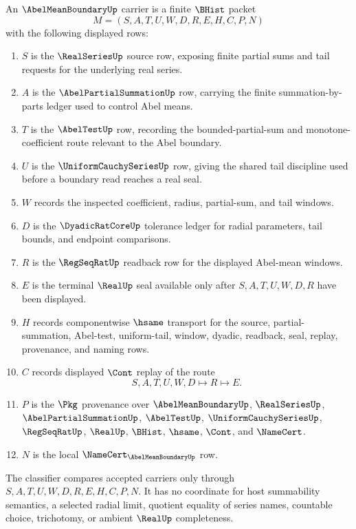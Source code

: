 \begin{definition}
\label{def:abel-mean-boundary-carrier}
An $\AbelMeanBoundaryUp$ carrier is a finite $\BHist$ packet
$$
M=(S,A,T,U,W,D,R,E,H,C,P,N)
$$
with the following displayed rows:
\begin{enumerate}
\item $S$ is the $\RealSeriesUp$ source row, exposing finite partial sums and tail requests for the underlying real series.
\item $A$ is the $\AbelPartialSummationUp$ row, carrying the finite summation-by-parts ledger used to control Abel means.
\item $T$ is the $\AbelTestUp$ row, recording the bounded-partial-sum and monotone-coefficient route relevant to the Abel boundary.
\item $U$ is the $\UniformCauchySeriesUp$ row, giving the shared tail discipline used before a boundary read reaches a real seal.
\item $W$ records the inspected coefficient, radius, partial-sum, and tail windows.
\item $D$ is the $\DyadicRatCoreUp$ tolerance ledger for radial parameters, tail bounds, and endpoint comparisons.
\item $R$ is the $\RegSeqRatUp$ readback row for the displayed Abel-mean windows.
\item $E$ is the terminal $\RealUp$ seal available only after $S,A,T,U,W,D,R$ have been displayed.
\item $H$ records componentwise $\hsame$ transport for the source, partial-summation, Abel-test, uniform-tail, window, dyadic, readback, seal, replay, provenance, and naming rows.
\item $C$ records displayed $\Cont$ replay of the route
$$
S,A,T,U,W,D \longmapsto R \longmapsto E .
$$
\item $P$ is the $\Pkg$ provenance over $\AbelMeanBoundaryUp$, $\RealSeriesUp$, $\AbelPartialSummationUp$, $\AbelTestUp$, $\UniformCauchySeriesUp$, $\RegSeqRatUp$, $\RealUp$, $\BHist$, $\hsame$, $\Cont$, and $\NameCert$.
\item $N$ is the local $\NameCert_{\AbelMeanBoundaryUp}$ row.
\end{enumerate}
The classifier compares accepted carriers only through $S,A,T,U,W,D,R,E,H,C,P,N$. It has no coordinate for host summability semantics, a selected radial limit, quotient equality of series names, countable choice, trichotomy, or ambient $\RealUp$ completeness.
\end{definition}

